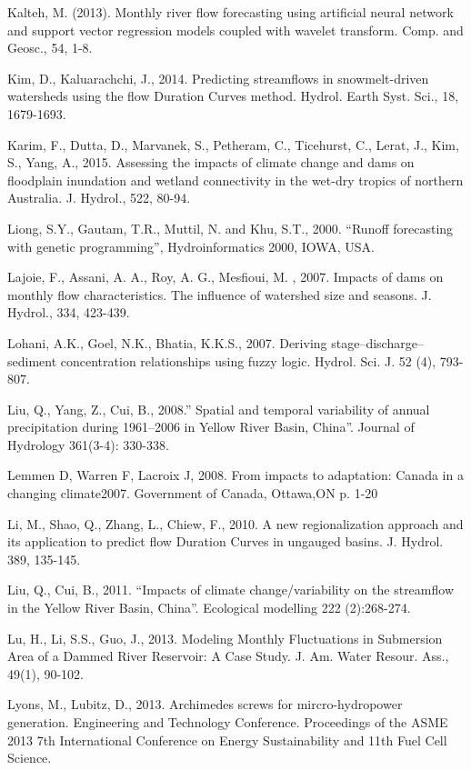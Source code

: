 \begin{hangingpar}{2em}
Kalteh, M. (2013). Monthly river flow forecasting using artificial neural network and support vector regression models coupled with wavelet transform. Comp. and Geosc., 54, 1-8.

Kim, D., Kaluarachchi, J., 2014. Predicting streamflows in snowmelt-driven watersheds using the flow Duration Curves method. Hydrol. Earth Syst. Sci., 18, 1679-1693.

Karim, F., Dutta, D., Marvanek, S., Petheram, C., Ticehurst, C., Lerat, J., Kim, S., Yang, A., 2015. Assessing the impacts of climate change and dams on floodplain inundation and wetland connectivity in the wet-dry tropics of northern Australia. J. Hydrol., 522, 80-94.

Liong, S.Y., Gautam, T.R., Muttil, N. and Khu, S.T., 2000. ``Runoff forecasting with genetic programming'', Hydroinformatics 2000, IOWA, USA.

Lajoie, F., Assani, A. A., Roy, A. G., Mesfioui, M. , 2007. Impacts of dams on monthly flow characteristics. The influence of watershed size and seasons. J.  Hydrol., 334, 423-439.

Lohani, A.K., Goel, N.K., Bhatia, K.K.S., 2007. Deriving stage–discharge–sediment concentration relationships using fuzzy logic. Hydrol. Sci. J. 52 (4), 793-807.

Liu, Q., Yang, Z., Cui, B., 2008.'' Spatial and temporal variability of annual precipitation during 1961–2006 in Yellow River Basin, China''.  Journal of Hydrology 361(3-4): 330-338. 

Lemmen D, Warren F, Lacroix J, 2008.  From impacts to adaptation: Canada in a changing climate2007. Government of Canada, Ottawa,ON p. 1-20

Li, M., Shao, Q., Zhang, L., Chiew, F., 2010. A new regionalization approach and its application to predict flow Duration Curves in ungauged basins. J. Hydrol. 389, 135-145.

Liu, Q., Cui, B., 2011. ``Impacts of climate change/variability on the streamflow in the Yellow River Basin, China''. Ecological modelling 222 (2):268-274.

Lu, H., Li, S.S., Guo, J., 2013. Modeling Monthly Fluctuations in Submersion Area of a Dammed River Reservoir: A Case Study. J. Am. Water Resour. Ass., 49(1), 90-102.

Lyons, M., Lubitz, D., 2013.  Archimedes screws for mircro-hydropower generation. Engineering and Technology Conference. Proceedings of the ASME 2013 7th International Conference on Energy Sustainability and 11th Fuel Cell Science. 


\end{hangingpar}
